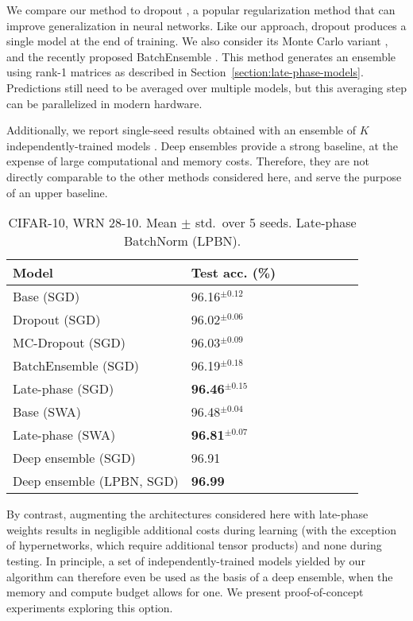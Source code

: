 \documentclass{article} \usepackage{iclr2021_conference,times}
\begin{document}
We compare our method to dropout  \citep{srivastava_dropout_2014}, a popular regularization method that can improve generalization in neural networks. Like our approach, dropout produces a single model at the end of training. We also consider its Monte Carlo variant \citep[MC-dropout;][]{gal_dropout_2016}, and the recently proposed BatchEnsemble \citep{wen_batchensemble_2020}. This method generates an ensemble using rank-1 matrices as described in Section~\ref{section:late-phase-models}. Predictions still need to be averaged over multiple models, but this averaging step can be parallelized in modern hardware.

Additionally, we report single-seed results obtained with an ensemble of $K$ independently-trained models \citep[a deep ensemble,][]{lakshminarayanan_simple_2017}. Deep ensembles provide a strong baseline, at the expense of large computational and memory costs. Therefore, they are not directly comparable to the other methods considered here, and serve the purpose of an upper baseline.

\setlength\intextsep{0pt}
\begin{wraptable}[16]{r}{0.5\textwidth}
\caption{CIFAR-10, WRN 28-10. Mean $\pm$ std.~over 5 seeds. Late-phase BatchNorm (LPBN).}
  \label{tab:CIFAR-10}
\centering
  {\renewcommand{\arraystretch}{1.1}\setlength{\tabcolsep}{4pt}
  \begin{tabular}{@{}llllllll@{}} 
    \toprule
Model & Test acc. (\%) \\\midrule
Base (SGD)      &    96.16$^{\pm 0.12}$  \\
Dropout (SGD)   & 96.02$^{\pm 0.06}$ \\
MC-Dropout (SGD)   & 96.03$^{\pm 0.09}$ \\
BatchEnsemble (SGD)   & 96.19$^{\pm 0.18}$ \\
Late-phase (SGD)  & \textbf{96.46}$^{\pm 0.15}$    \\\midrule
Base (SWA)      &    96.48$^{\pm 0.04}$   \\
Late-phase (SWA) & \textbf{96.81}$^{\pm 0.07}$    \\
\midrule
Deep ensemble (SGD) &  96.91  \\
Deep ensemble (LPBN, SGD) &  \textbf{96.99}  \\\bottomrule
    \end{tabular}}
\end{wraptable}
By contrast, augmenting the architectures considered here with late-phase weights results in negligible additional costs during learning (with the exception of hypernetworks, which require additional tensor products) and none during testing. In principle, a set of independently-trained models yielded by our algorithm can therefore even be used as the basis of a deep ensemble, when the memory and compute budget allows for one. We present proof-of-concept experiments exploring this option.
\end{document}
